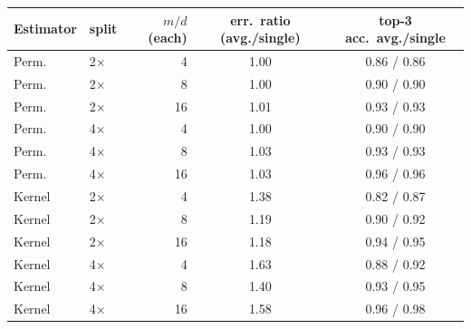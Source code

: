 \begin{tabular}{llr|cc}
\toprule
Estimator & split & $m/d$ (each) & err.\ ratio (avg./single) & top-3 acc.\ avg./single\\
\midrule
Perm. & 2$\times$ & 4 & 1.00 & 0.86 / 0.86\\
Perm. & 2$\times$ & 8 & 1.00 & 0.90 / 0.90\\
Perm. & 2$\times$ & 16 & 1.01 & 0.93 / 0.93\\
Perm. & 4$\times$ & 4 & 1.00 & 0.90 / 0.90\\
Perm. & 4$\times$ & 8 & 1.03 & 0.93 / 0.93\\
Perm. & 4$\times$ & 16 & 1.03 & 0.96 / 0.96\\
Kernel & 2$\times$ & 4 & 1.38 & 0.82 / 0.87\\
Kernel & 2$\times$ & 8 & 1.19 & 0.90 / 0.92\\
Kernel & 2$\times$ & 16 & 1.18 & 0.94 / 0.95\\
Kernel & 4$\times$ & 4 & 1.63 & 0.88 / 0.92\\
Kernel & 4$\times$ & 8 & 1.40 & 0.93 / 0.95\\
Kernel & 4$\times$ & 16 & 1.58 & 0.96 / 0.98\\
\bottomrule
\end{tabular}
